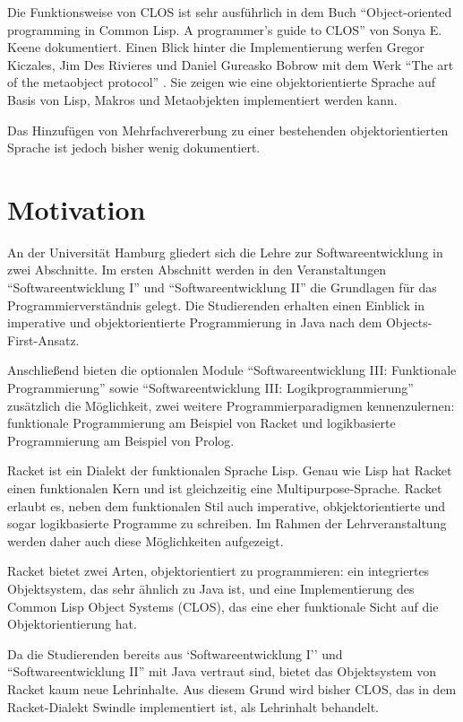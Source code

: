 Die Funktionsweise von CLOS ist sehr ausführlich in dem Buch ``Object-oriented programming in Common Lisp. A programmer's guide to CLOS'' von Sonya E. Keene \cite{keene} dokumentiert. Einen Blick hinter die Implementierung werfen Gregor Kiczales, Jim Des Rivieres und Daniel Gureasko Bobrow mit dem Werk ``The art of the metaobject protocol'' \cite{amop}. Sie zeigen wie eine objektorientierte Sprache auf Basis von Lisp, Makros und Metaobjekten implementiert werden kann. 

Das Hinzufügen von Mehrfachvererbung zu einer bestehenden objektorientierten Sprache ist jedoch bisher wenig dokumentiert. 

\section{Motivation} 
An der Universität Hamburg gliedert sich die Lehre zur Softwareentwicklung in zwei Abschnitte. Im ersten Abschnitt werden in den Veranstaltungen ``Softwareentwicklung I'' und ``Softwareentwicklung II'' die Grundlagen für das Programmierverständnis gelegt. Die Studierenden erhalten einen  Einblick in imperative und objektorientierte Programmierung in Java nach dem Objects-First-Ansatz.

Anschließend bieten die optionalen Module ``Softwareentwicklung III: Funktionale Programmierung'' sowie ``Softwareentwicklung III: Logikprogrammierung'' zusätzlich die Möglichkeit, zwei weitere  Programmierparadigmen kennenzulernen: funktionale Programmierung am Beispiel von Racket und logikbasierte Programmierung am Beispiel von Prolog.

Racket ist ein Dialekt der funktionalen Sprache Lisp. Genau wie Lisp hat Racket einen funktionalen Kern und ist gleichzeitig eine Mul\-ti\-pur\-pose-Spra\-che. Racket erlaubt es, neben dem funktionalen Stil auch imperative, obkjektorientierte und sogar logikbasierte Programme zu schreiben. Im Rahmen der Lehrveranstaltung werden daher auch diese Möglichkeiten aufgezeigt. 

Racket bietet zwei Arten, objektorientiert zu programmieren: ein integriertes Objektsystem, das sehr ähnlich zu Java ist, und eine Implementierung des Common Lisp Object Systems (CLOS), das eine eher funktionale Sicht auf die Objektorientierung hat. 

Da die Studierenden bereits aus `Softwareentwicklung I'' und ``Softwareentwicklung II'' mit Java vertraut sind, bietet das Objektsystem von Racket kaum neue Lehrinhalte. Aus diesem Grund wird bisher CLOS, das in dem Racket-Dialekt Swindle implementiert ist, als Lehrinhalt behandelt. 

